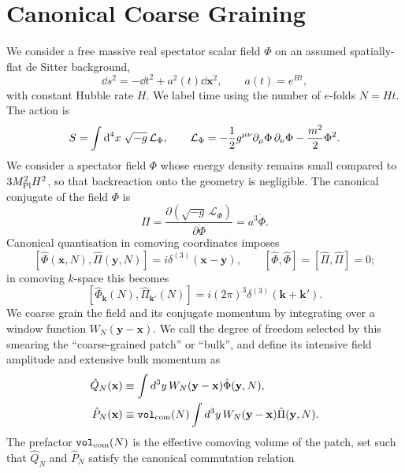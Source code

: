\documentclass{article}
\def\exd{{\hbox{d}}}
\newcommand{\VF}{\mathtt{vol}_{\rm com}}
\newcommand{\hvarphi}{\hat{\Phi}}
\newcommand{\hpi}{\hat{\Pi}}
\numberwithin{equation}{section}
\begin{document}
	\section{Canonical Coarse Graining}
	\label{sec:coarsegraining_hamiltonian}
	We consider a free massive real spectator scalar field $\Phi$ on an assumed spatially-flat de Sitter background,
	\begin{equation}\label{eq:frw-metric}
		\dd s^{2}=-\dd t^{2}+a^{2}(t)\dd \bm{x}^{2}, \qquad a(t)=e^{Ht},
	\end{equation}
	with constant Hubble rate $H$. We label time using the number of \(e\)-folds \(N = H t\). The action is
	\begin{equation}\label{eq:action}
		S=\int \exd^{4}x\; \sqrt{-g}\, \mathcal{L}_{\Phi}, \qquad \mathcal L_\Phi = -\frac12 g^{\mu\nu}\partial_\mu\Phi\,\partial_\nu\Phi -\frac{m^2}{2}\Phi^2 .
	\end{equation}
    We consider a spectator field \(\Phi\) whose energy density remains small compared to
	\( 3M_{\rm Pl}^2H^2\), so that	backreaction onto the geometry is negligible. The canonical conjugate of the field $\Phi$ is
	\begin{equation}\label{eq:pivarphi}
		\Pi = \frac{\partial(\sqrt{-g}\,\mathcal L_\Phi)} {\partial \dot\Phi} = a^3\dot\Phi .
	\end{equation}
	Canonical quantisation in comoving coordinates imposes
	\begin{equation}\label{eq:ETCR}
		[\hvarphi(\bm x, N),\hpi(\bm y,N)] = i\delta^{(3)}(\bm x-\bm y), \qquad [\hvarphi,\hvarphi]=[\hpi,\hpi]=0 ;
	\end{equation}
	in comoving $k$-space this becomes
	\begin{equation}\label{eq:ETCRk}
		[\hvarphi_{\bm k}(N),\hpi_{\bm k'}(N)] = i(2\pi)^3\delta^{(3)}(\bm k+\bm k') .
	\end{equation}
	We coarse grain the field and its conjugate momentum by integrating over a window function $W_N(\bm{y}-\bm{x})$. We call the degree of freedom selected by	this smearing the ``coarse-grained patch'' or ``bulk'', and define its intensive field amplitude and extensive bulk momentum as
	\begin{align} \label{eq:cg:fields:def}
    \hat Q_N(\mathbf x)
    &\equiv \int d^3y\,W_N(\mathbf y-\mathbf x)\hat\Phi(\mathbf y, N),
    \\
    \hat P_N(\mathbf x)
    &\equiv \VF(N)\int d^3y\,W_N(\mathbf y-\mathbf x)\hat\Pi(\mathbf y, N).
    \end{align}
	The prefactor $\VF(N)$ is the effective comoving volume of the patch, set such that $\hat Q_N$ and $\hat P_N$ satisfy the canonical commutation relation
\end{document}
